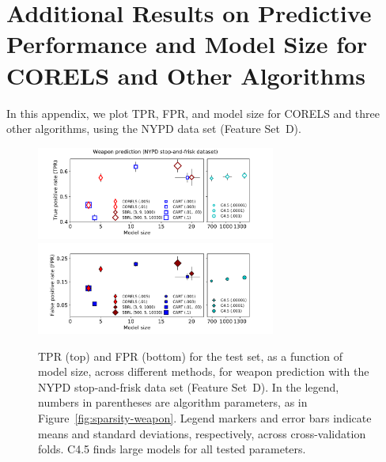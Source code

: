 \documentclass[twoside,11pt]{article}
\begin{document}
\clearpage
\section{Additional Results on Predictive Performance and Model Size for
CORELS and Other Algorithms}
\label{appendix:cpw}

In this appendix, we plot TPR, FPR, and model size for CORELS and three other
algorithms, using the NYPD data set (Feature Set~D).

\begin{figure}[htb!]
\begin{center}
\includegraphics[trim={17mm, 0mm, 27mm, 0mm},
width=0.7\textwidth]{figs/cpw-noloc-sparsity-tpr.pdf}
\includegraphics[trim={17mm, 10mm, 27mm, 4mm},
width=0.7\textwidth]{figs/cpw-noloc-sparsity-fpr.pdf}
\end{center}
\caption{TPR (top) and FPR (bottom)
for the test set, as a function of model size, across different methods,
for weapon prediction with the NYPD stop-and-frisk data set (Feature Set~D).
%
In the legend, numbers in parentheses are algorithm parameters,
as in Figure~\ref{fig:sparsity-weapon}.
%
Legend markers and error bars indicate means and standard deviations,
respectively, across cross-validation folds.
%
%
C4.5 finds large models for all tested parameters.
}
\label{fig:sparsity-cpw}
\end{figure}


\end{document}
